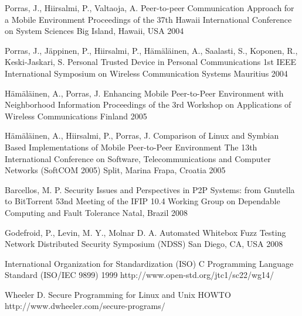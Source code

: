 \begin{thebibliography}{9}
		{Porras, J., Hiirsalmi, P., Valtaoja, A.} %
		{Peer-to-peer Communication Approach for a Mobile Environment}
		{Proceedings of the 37th {H}awaii International Conference on System Sciences}
		{Big Island, Hawaii, USA}
		{2004}
	
		{Porras, J., J\"appinen, P., Hiirsalmi, P., H\"am\"al\"ainen, A., Saalasti, S., Koponen, R., Keski-Jaskari, S.} %
		{Personal Trusted Device in Personal Communications}
		{1st {IEEE} International Symposium on Wireless Communication Systems}
		{Mauritius}
		{2004}
	
		{H\"am\"al\"ainen, A., Porras, J.} %
		{Enhancing Mobile Peer-to-Peer Environment with Neighborhood Information}
		{Proceedings of the 3rd Workshop on Applications of Wireless Communications}
		{Finland}
		{2005}
	
		{H\"am\"al\"ainen, A., Hiirsalmi, P., Porras, J.} %
		{Comparison of {L}inux and {S}ymbian Based Implementations of Mobile Peer-to-Peer Environment}
		{The 13th International Conference on Software, Telecommunications and Computer Networks ({SoftCOM} 2005)}
		{Split, Marina Frapa, Croatia}
		{2005}
	
		{Barcellos, M. P.} %
		{Security Issues and Perspectives in P2P Systems: from Gnutella to BitTorrent}
		{53nd Meeting of the IFIP 10.4 Working Group on Dependable Computing and Fault Tolerance}
		{Natal, Brazil}
		{2008}
	
		{Godefroid, P., Levin, M. Y., Molnar D. A.} %
		{Automated Whitebox Fuzz Testing}
		{Network Distributed Security Symposium ({NDSS})}
		{San Diego, CA, USA}
		{2008}


		{International Organization for Standardization (ISO)}
		{{C} Programming Language Standard ({ISO/IEC} 9899)}
		{1999}
		{http://www.open-std.org/jtc1/sc22/wg14/}
		
		{Wheeler D.} %
		{Secure Programming for {L}inux and {U}nix {HOWTO}}
		{}
		{http://www.dwheeler.com/secure-programs/}
		

\end{thebibliography}
